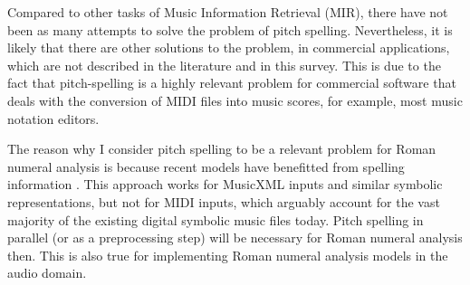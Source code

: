 





Compared to other tasks of Music Information Retrieval
(MIR), there have not been as many attempts to solve the
problem of pitch spelling. Nevertheless, it is likely that
there are other solutions to the problem, in commercial
applications, which are not described in the literature and
in this survey. This is due to the fact that pitch-spelling
is a highly relevant problem for commercial software that
deals with the conversion of MIDI files into music scores,
for example, most music notation editors.

The reason why I consider pitch spelling to be a relevant problem for Roman numeral analysis is because recent models have benefitted from spelling information \parencite{micchi2020not}. This approach works for MusicXML inputs and similar symbolic representations, but not for MIDI inputs, which arguably account for the vast majority of the existing digital symbolic music files today. Pitch spelling in parallel (or as a preprocessing step) will be necessary for Roman numeral analysis then. This is also true for implementing Roman numeral analysis models in the audio domain.
